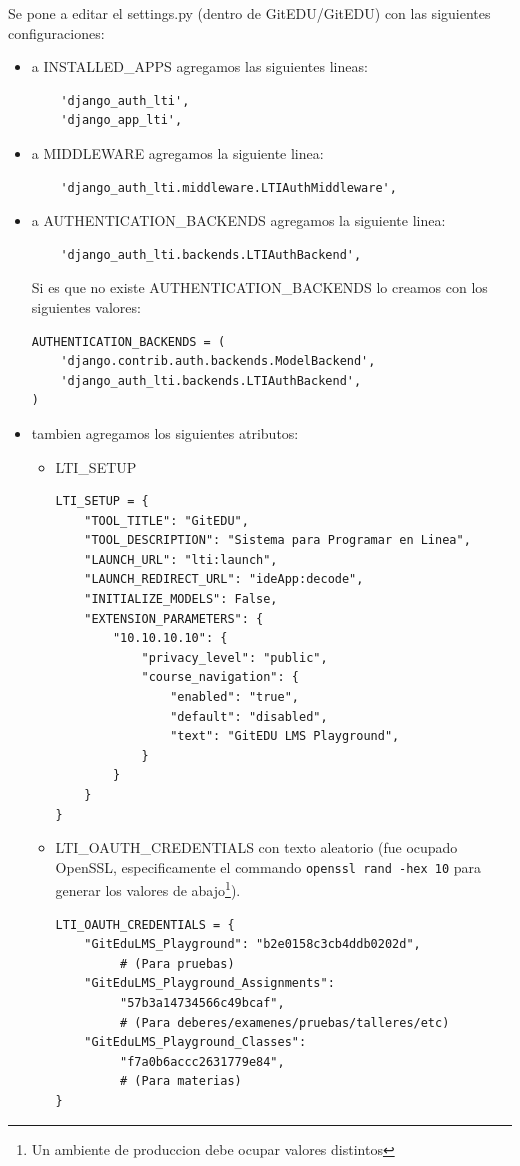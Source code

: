 Se pone a editar el settings.py (dentro de GitEDU/GitEDU) con las siguientes configuraciones:
\begin{itemize}
	\item a INSTALLED\_APPS agregamos las siguientes lineas:
   		\begin{lstlisting}
    'django_auth_lti',
    'django_app_lti',
    	\end{lstlisting}
    \item a MIDDLEWARE agregamos la siguiente linea:
   		\begin{lstlisting}
    'django_auth_lti.middleware.LTIAuthMiddleware',
    	\end{lstlisting}
    \item a AUTHENTICATION\_BACKENDS agregamos la siguiente linea:
   		\begin{lstlisting}
    'django_auth_lti.backends.LTIAuthBackend',
    	\end{lstlisting}
        Si es que no existe AUTHENTICATION\_BACKENDS lo creamos con los siguientes valores:
        \begin{lstlisting}
AUTHENTICATION_BACKENDS = (
    'django.contrib.auth.backends.ModelBackend',
    'django_auth_lti.backends.LTIAuthBackend',
)
        \end{lstlisting}
    \item tambien agregamos los siguientes atributos:
    	\begin{itemize}
    		\item LTI\_SETUP
            	\begin{lstlisting}
LTI_SETUP = {
    "TOOL_TITLE": "GitEDU",
    "TOOL_DESCRIPTION": "Sistema para Programar en Linea",
    "LAUNCH_URL": "lti:launch",
    "LAUNCH_REDIRECT_URL": "ideApp:decode",
    "INITIALIZE_MODELS": False,
    "EXTENSION_PARAMETERS": {
        "10.10.10.10": {
            "privacy_level": "public",
            "course_navigation": {
                "enabled": "true",
                "default": "disabled",
                "text": "GitEDU LMS Playground",
            }
        }
    }
}
            	\end{lstlisting}
            \item LTI\_OAUTH\_CREDENTIALS con texto aleatorio (fue ocupado OpenSSL, especificamente el commando \texttt{openssl rand -hex 10} para generar los valores de abajo\footnote{Un ambiente de produccion debe ocupar valores distintos}).
            	\begin{lstlisting}
LTI_OAUTH_CREDENTIALS = {
    "GitEduLMS_Playground": "b2e0158c3cb4ddb0202d", 
         # (Para pruebas)
    "GitEduLMS_Playground_Assignments":
         "57b3a14734566c49bcaf",
         # (Para deberes/examenes/pruebas/talleres/etc)
    "GitEduLMS_Playground_Classes":
         "f7a0b6accc2631779e84",
         # (Para materias)
}
            	\end{lstlisting}
    	\end{itemize}
\end{itemize}

